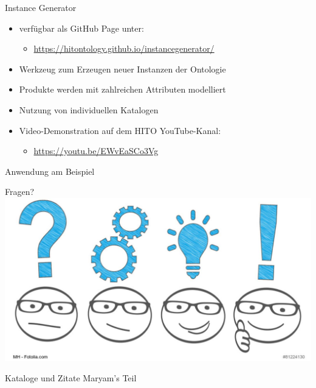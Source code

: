 \documentclass[aspectratio=1610,12pt]{beamer}
\begin{document}
\begin{frame}{Instance Generator}
\begin{spacing}{1.25}
\begin{itemize}
\item verfügbar als GitHub Page unter:
\begin{itemize}
\item \url{https://hitontology.github.io/instancegenerator/}
\end{itemize}
\item Werkzeug zum Erzeugen neuer Instanzen der Ontologie
\item Produkte werden mit zahlreichen Attributen modelliert
\item Nutzung von individuellen Katalogen
\item Video-Demonstration auf dem HITO YouTube-Kanal:
\begin{itemize}
\item \url{https://youtu.be/EWvEaSCo3Vg}
\end{itemize}
\end{itemize}
\end{spacing}
\end{frame}

\begin{frame}{Anwendung am Beispiel}

\end{frame}

\begin{frame}{Fragen?}
  \centering
  \vspace{-0.5cm}
  \includegraphics[width=\textwidth]{img/fragen.png}
\end{frame}

\begin{frame}{Kataloge und Zitate}
  \centering
  \huge Maryam's Teil
\end{frame}
\end{document}
